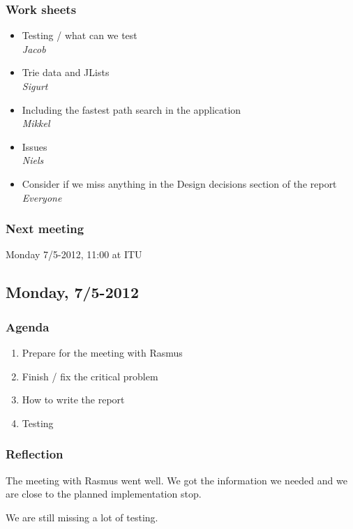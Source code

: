 \documentclass[a4paper,11pt]{article}
\begin{document}
\subsubsection*{Work sheets}
\begin{itemize}
	\item Testing / what can we test \\
		\textsl{Jacob}
	\item Trie data and JLists \\
		\textsl{Sigurt}
	\item Including the fastest path search in the application \\
		\textsl{Mikkel}
	\item Issues \\
		\textsl{Niels}
	\item Consider if we miss anything in the Design decisions section of the report \\
		\textsl{Everyone}
\end{itemize}

\subsubsection*{Next meeting}
Monday 7/5-2012, 11:00 at ITU


\pagebreak
\subsection{Monday, 7/5-2012}

\subsubsection*{Agenda}
\begin{enumerate}
	\item Prepare for the meeting with Rasmus
	\item Finish / fix the critical problem
	\item How to write the report
	\item Testing
\end{enumerate}

\subsubsection*{Reflection}
The meeting with Rasmus went well. We got the information we needed and we are close to the planned implementation stop.

We are still missing a lot of testing.
\end{document}
